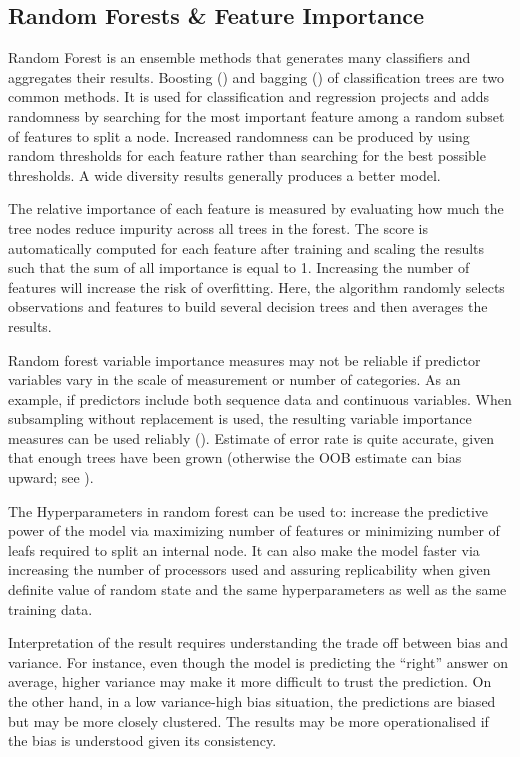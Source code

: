 \documentclass{elsarticle}
\begin{document}
\subsection{Random Forests & Feature Importance}
Random Forest is an ensemble methods that generates many classifiers and aggregates their results. Boosting (\cite{Shapire1998}) and bagging (\cite{Breiman1996}) of classification trees are two common methods. It is used for classification and regression projects and adds randomness by searching for the most important feature among a random subset of features to split a node. Increased randomness can be produced by using random thresholds for each feature rather than searching for the best possible thresholds. A wide diversity results generally produces a better model.

The relative importance of each feature is measured by evaluating how much the tree nodes reduce impurity across all trees in the forest. The score is automatically computed for each feature after training and scaling the results such that the sum of all importance is equal to 1. Increasing the number of features will increase the risk of overfitting. Here, the algorithm randomly selects observations and features to build several decision trees and then averages the results.

Random forest variable importance measures may not be reliable if predictor variables vary in the scale of measurement or number of categories. As an example, if predictors include both sequence data and continuous variables. When subsampling without replacement is used, the resulting variable importance measures can be used reliably (\cite{Strobl2007}). Estimate of error rate is quite accurate, given that enough trees have been grown (otherwise the OOB estimate can bias upward; see \cite{Bylander2002}).

The Hyperparameters in random forest can be used to: increase the predictive power of the model via maximizing number of features or minimizing number of leafs required to split an internal node. It can also make the model faster via increasing the number of processors used and assuring replicability when given definite value of random state and the same hyperparameters as well as the same training data.

Interpretation of the result requires understanding the trade off between bias and variance. For instance, even though the model is predicting the “right” answer on average, higher variance may make it more difficult to trust the prediction. On the other hand, in a low variance-high bias situation, the predictions are biased but may be more closely clustered. The results may be more operationalised if the bias is understood given its consistency.
\end{document}
